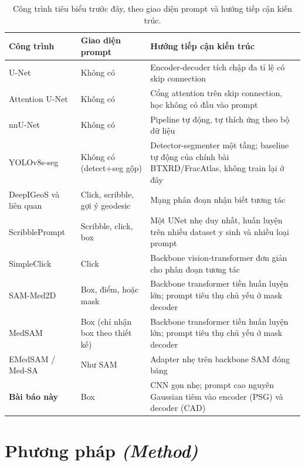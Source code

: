 \documentclass[11pt]{article}
\newcommand{\enlabel}[1]{{\small\itshape\color{gray} (#1)}}
\begin{document}
\begin{table}[H]
\caption{Công trình tiêu biểu trước đây, theo giao diện prompt và hướng tiếp cận kiến trúc.}
\label{tab:relwork}
\centering
\scriptsize
\begin{tabular}{L{2.3cm}L{2.6cm}L{3.6cm}}
\toprule
Công trình & Giao diện prompt & Hướng tiếp cận kiến trúc \\
\midrule
U-Net & Không có & Encoder-decoder tích chập đa tỉ lệ có skip connection \\
\midrule
Attention U-Net & Không có & Cổng attention trên skip connection, học không có đầu vào prompt \\
\midrule
nnU-Net & Không có & Pipeline tự động, tự thích ứng theo bộ dữ liệu \\
\midrule
YOLOv8s-seg & Không có (detect+seg gộp) & Detector-segmenter một tầng; baseline tự động của chính bài BTXRD/FracAtlas, không train lại ở đây \\
\midrule
DeepIGeoS và liên quan & Click, scribble, gợi ý geodesic & Mạng phân đoạn nhận biết tương tác \\
\midrule
ScribblePrompt & Scribble, click, box & Một UNet nhẹ duy nhất, huấn luyện trên nhiều dataset y sinh và nhiều loại prompt \\
\midrule
SimpleClick & Click & Backbone vision-transformer đơn giản cho phân đoạn tương tác \\
\midrule
SAM-Med2D & Box, điểm, hoặc mask & Backbone transformer tiền huấn luyện lớn; prompt tiêu thụ chủ yếu ở mask decoder \\
\midrule
MedSAM & Box (chỉ nhận box theo thiết kế) & Backbone transformer tiền huấn luyện lớn; prompt tiêu thụ chủ yếu ở mask decoder \\
\midrule
EMedSAM / Med-SA & Như SAM & Adapter nhẹ trên backbone SAM đóng băng \\
\midrule
\textbf{Bài báo này} & Box & CNN gọn nhẹ; prompt cao nguyên Gaussian tiêm vào encoder (PSG) và decoder (CAD) \\
\bottomrule
\end{tabular}
\end{table}

\section{Phương pháp \enlabel{Method}}
\end{document}
